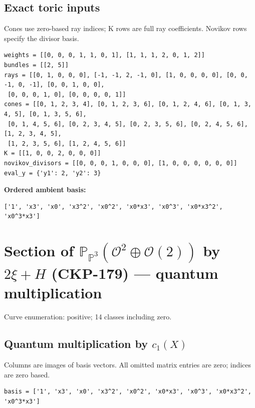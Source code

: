 \documentclass[10pt,a4paper]{article}
\begin{document}
\subsection*{Exact toric inputs}
Cones use zero-based ray indices; K rows are full ray coefficients. Novikov rows specify the divisor basis.

\begin{lstlisting}
weights = [[0, 0, 0, 1, 1, 0, 1], [1, 1, 1, 2, 0, 1, 2]]
bundles = [[2, 5]]
rays = [[0, 1, 0, 0, 0], [-1, -1, 2, -1, 0], [1, 0, 0, 0, 0], [0, 0, -1, 0, -1], [0, 0, 1, 0, 0],
 [0, 0, 0, 1, 0], [0, 0, 0, 0, 1]]
cones = [[0, 1, 2, 3, 4], [0, 1, 2, 3, 6], [0, 1, 2, 4, 6], [0, 1, 3, 4, 5], [0, 1, 3, 5, 6],
 [0, 1, 4, 5, 6], [0, 2, 3, 4, 5], [0, 2, 3, 5, 6], [0, 2, 4, 5, 6], [1, 2, 3, 4, 5],
 [1, 2, 3, 5, 6], [1, 2, 4, 5, 6]]
K = [[1, 0, 0, 2, 0, 0, 0]]
novikov_divisors = [[0, 0, 0, 1, 0, 0, 0], [1, 0, 0, 0, 0, 0, 0]]
eval_y = {'y1': 2, 'y2': 3}
\end{lstlisting}

\textbf{Ordered ambient basis:}
\begin{lstlisting}
['1', 'x3', 'x0', 'x3^2', 'x0^2', 'x0*x3', 'x0^3', 'x0*x3^2', 'x0^3*x3']
\end{lstlisting}

\clearpage\section*{Section of $\mathbb P_{\mathbb P^{3}}(\mathcal O^{2}\oplus \mathcal O(2))$ by $2\xi +H$ (CKP-179) --- quantum multiplication}

Curve enumeration: positive; 14 classes including zero.
\subsection*{Quantum multiplication by $c_1(X)$}
Columns are images of basis vectors. All omitted matrix entries are zero; indices are zero based.

\begin{lstlisting}
basis = ['1', 'x3', 'x0', 'x3^2', 'x0^2', 'x0*x3', 'x0^3', 'x0*x3^2', 'x0^3*x3']
\end{lstlisting}
\end{document}
